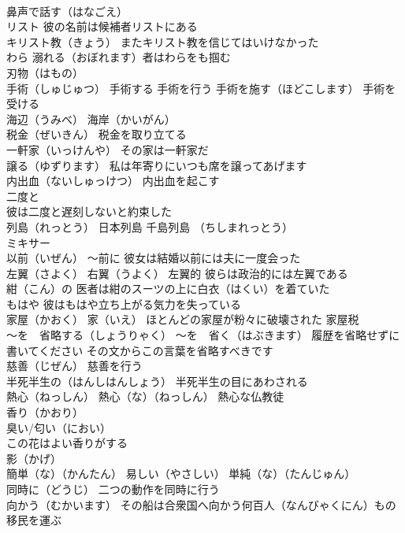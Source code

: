 \documentclass[8pt]{extreport}
\begin{document}
\begin{CJK}{UTF8}{min}
\\	鼻声で話す（はなごえ）
\\	リスト 彼の名前は候補者リストにある
\\	キリスト教（きょう） またキリスト教を信じてはいけなかった
\\	わら 溺れる（おぼれます）者はわらをも掴む
\\	刃物（はもの）
\\	手術（しゅじゅつ） 手術する 手術を行う 手術を施す（ほどこします） 手術を受ける
\\	海辺（うみべ） 海岸（かいがん）
\\	税金（ぜいきん） 税金を取り立てる
\\	一軒家（いっけんや） その家は一軒家だ
\\	譲る（ゆずります） 私は年寄りにいつも席を譲ってあげます
\\	内出血（ないしゅっけつ） 内出血を起こす
\\	二度と
\\	彼は二度と遅刻しないと約束した
\\	列島（れっとう） 日本列島 千島列島 （ちしまれっとう）
\\	ミキサー
\\	以前（いぜん） ～前に 彼女は結婚以前には夫に一度会った
\\	左翼（さよく） 右翼（うよく） 左翼的 彼らは政治的には左翼である
\\	紺（こん）の 医者は紺のスーツの上に白衣（はくい）を着ていた
\\	もはや 彼はもはや立ち上がる気力を失っている
\\	家屋（かおく） 家（いえ） ほとんどの家屋が粉々に破壊された 家屋税
\\	～を　省略する（しょうりゃく） ～を　省く（はぶきます） 履歴を省略せずに書いてください その文からこの言葉を省略すべきです
\\	慈善（じぜん） 慈善を行う
\\	半死半生の（はんしはんしょう） 半死半生の目にあわされる
\\	熱心（ねっしん） 熱心（な）（ねっしん） 熱心な仏教徒
\\	香り（かおり）
\\	臭い/匂い（におい）
\\	この花はよい香りがする
\\	影（かげ）
\\	簡単（な）（かんたん） 易しい（やさしい） 単純（な）（たんじゅん）
\\	同時に（どうじ） 二つの動作を同時に行う
\\	向かう（むかいます） その船は合衆国へ向かう何百人（なんびゃくにん）もの移民を運ぶ

\end{CJK}
\end{document}
